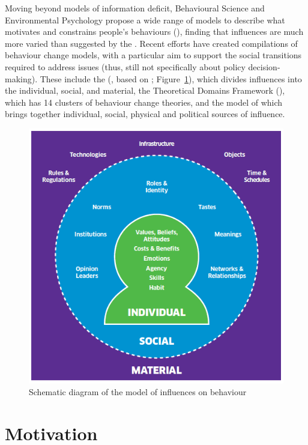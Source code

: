 Moving beyond models of information deficit, Behavioural Science and Environmental Psychology propose a wide range of models to describe what motivates and constrains people's behaviours (\cite{Darnton2008}), finding that influences are much more varied than suggested by the \IDM. Recent efforts have created compilations of behaviour change models, with a particular aim to support the social transitions required to address \CAN{} issues (thus, still not specifically about policy decision-making). These include the \ISM{} (\cite{DarntonH2013}, based on \cite{SouthertonME2011}; Figure~\ref{fig:ism}), which divides influences into the individual, social, and material, the Theoretical Domains Framework (\cite{AtkinsFIOPIFDCGLM2017}), which has 14 clusters of behaviour change theories, and the model of \textcite{HamptonW2023} which brings together individual, social, physical and political sources of influence.

\begin{figure}
    \centering
    \includegraphics[width=0.5\linewidth]{figures/ism.png}
    \caption{Schematic diagram of the \ISM{} model of influences on behaviour}
    \label{fig:ism}
\end{figure}

\section{Motivation}\label{sec:litjust}

